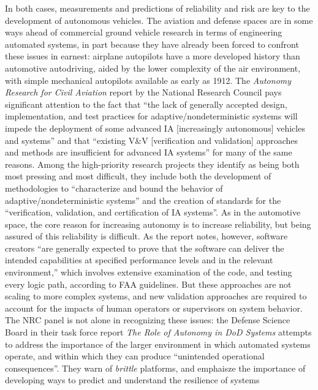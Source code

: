In both cases, measurements and predictions of reliability and risk
are key to the development of autonomous vehicles. The aviation and
defense spaces are in some ways ahead of commercial ground vehicle
research in terms of engineering automated systems, in part because
they have already been forced to confront these issues in earnest:
airplane autopilots have a more developed history than automotive
autodriving, aided by the lower complexity of the air environment,
with simple mechanical autopilots available as early as
1912.\cite[p. 16]{???-NRCAutonomy} The \emph{Autonomy Research for
  Civil Aviation} report by the National Research Council pays
significant attention to the fact that ``the lack of generally
accepted design, implementation, and test practices for
adaptive/nondeterministic systems will impede the deployment of some
advanced IA [increasingly autonomous] vehicles and systems'' and that
``existing V\&V [verification and
  validation] approaches and methods are insufficient for advanced IA
systems'' for many of the same reasons.\cite[p. 2]{???-NRCAutonomy}
Among the high-priority research projects they identify as being both
most pressing and most difficult, they include both the development of
methodologies to ``characterize and bound the behavior of
adaptive/nondeterministic systems'' and the creation of standards for
the ``verification, validation, and certification of IA
systems''\cite[p. 4]{???-NRCAutonomy}. As in the automotive space, the
core reason for increasing autonomy is to increase reliability, but
being assured of this reliability is difficult. As the report notes,
however, software creators ``are generally expected to prove that the
software can deliver the intended capabilities at specified
performance levels and in the relevant environment,'' which involves
extensive examination of the code, and testing every logic path,
according to FAA guidelines.\cite[p. 39--40]{???-NRCAutonomy} But
these approaches are not scaling to more complex systems, and new
validation approaches are required to account for the impacts of human
operators or supervisors on system behavior.\cite[p.
  40]{???-NRCAutonomy} The NRC panel is not alone in recognizing these
issues: the Defense Science Board in their task force report \emph{The
  Role of Autonomy in DoD Systems} attempts to address the importance
of the larger environment in which automated systems operate, and
within which they can produce ``unintended operational
consequences''\cite[p. 2]{???-DSB}. They warn of \emph{brittle}
platforms, and emphaisze the importance of developing ways to predict
and understand the resilience of systems\cite[p. 7, 11]{???-DSB}

